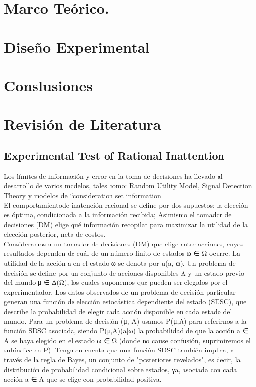 \documentclass[11pt,letterpaper]{article}
\begin{document}
\section{Marco Teórico.}




\section{Diseño Experimental}



\section{Conslusiones}

\section{Revisión de Literatura}

\subsection{Experimental Test of Rational Inattention}

Los límites de información y error en la toma de decisiones ha llevado al desarrollo de varios modelos, tales como: Random Utility Model, Signal Detection Theory y modelos de “consideration set information\\

El comportamientode inatención racional se define por dos supuestos: la elección es óptima, condicionada a la información recibida; Asimismo el tomador de decisiones (DM) elige qué información recopilar para maximizar la utilidad de la elección posterior, neta de costos.\\

Consideramos a un tomador de decisiones (DM) que elige entre acciones, cuyos resultados dependen de cuál de un número finito de estados ω ∈ Ω ocurre. La utilidad de la acción a en el estado ω se denota por u(a, ω). Un problema de decisión se define por un conjunto de acciones disponibles A y un estado previo del mundo μ ∈ ∆(Ω), los cuales suponemos que pueden ser elegidos por el experimentador. Los datos observados de un problema de decisión particular generan una función de elección estocástica dependiente del estado (SDSC), que describe la probabilidad de elegir cada acción disponible en cada estado del mundo. Para un problema de decisión (μ, A) usamos P(μ,A) para referirnos a la función SDSC asociada, siendo P(μ,A)(a|ω) la probabilidad de que la acción a ∈ A se haya elegido en el estado ω ∈ Ω (donde no cause confusión, suprimiremos el subíndice en P). Tenga en cuenta que una función SDSC también implica, a través de la regla de Bayes, un conjunto de "posteriores revelados", es decir, la distribución de probabilidad condicional sobre estados, γa, asociada con cada acción a ∈ A que se elige con probabilidad positiva.\\
\end{document}
